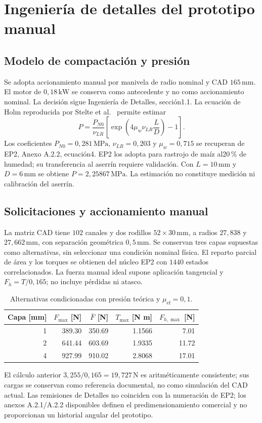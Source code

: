 \section{Ingeniería de detalles del prototipo manual}
\subsection{Modelo de compactación y presión}
Se adopta accionamiento manual por manivela de radio nominal y CAD $165\,\mathrm{mm}$.
El motor de $0,18\,\mathrm{kW}$ se conserva como antecedente y no como accionamiento nominal.
La decisión sigue Ingeniería de Detalles, sección1.1\parencite{equipo_detalles_prototipo_2026}.
La ecuación de Holm reproducida por Stelte et al.\ \parencite{stelte_presion_2011} permite estimar
\begin{equation}P=\frac{P_{N0}}{\nu_{LR}}\left[\exp\left(4\mu_w\nu_{LR}\frac{L}{D}\right)-1\right].\end{equation}
Los coeficientes $P_{N0}=0,281\,\mathrm{MPa}$, $\nu_{LR}=0,203$ y $\mu_w=0,715$
se recuperan de EP2, Anexo A.2.2, ecuación4\parencite{equipo_entrega2_2026}.
EP2 los adopta para rastrojo de maíz al20\,\% de humedad; su transferencia al aserrín requiere validación.
Con $L=10\,\mathrm{mm}$ y $D=6\,\mathrm{mm}$ se obtiene $P=2,25867\,\mathrm{MPa}$.
La estimación no constituye medición ni calibración del aserrín.
\subsection{Solicitaciones y accionamiento manual}
La matriz CAD tiene $102$ canales y dos rodillos $52\times30\,\mathrm{mm}$,
a radios $27,838$ y $27,662\,\mathrm{mm}$, con separación geométrica $0,5\,\mathrm{mm}$.
Se conservan tres capas supuestas como alternativas, sin seleccionar una condición nominal física.
El reparto parcial de área y los torques se obtienen del núcleo EP2 con $1440$ estados correlacionados.
La fuerza manual ideal supone aplicación tangencial y $F_h=T/0,165$; no incluye pérdidas ni atasco.
\begin{table}[ht]\centering
\begin{tabular}{rrrrr}\toprule
Capa [mm]&$F_{\max}$ [N]&$\bar F$ [N]&$T_{\max}$ [N m]&$F_{h,\max}$ [N]\\\midrule
1 & 389.30 & 350.69 & 1.1566 & 7.01\\
2 & 641.44 & 603.69 & 1.9335 & 11.72\\
4 & 927.99 & 910.02 & 2.8068 & 17.01\\
\bottomrule\end{tabular}
\caption{Alternativas condicionadas con presión teórica y $\mu_{\mathrm{ef}}=0,1$.}
\end{table}
El cálculo anterior $3,255/0,165=19,727\,\mathrm{N}$ es aritméticamente consistente;
sus cargas se conservan como referencia documental, no como simulación del CAD actual.
Las remisiones de Detalles no coinciden con la numeración de EP2; los anexos A.2.1/A.2.2 disponibles
definen el predimensionamiento comercial y no proporcionan un historial angular del prototipo.

